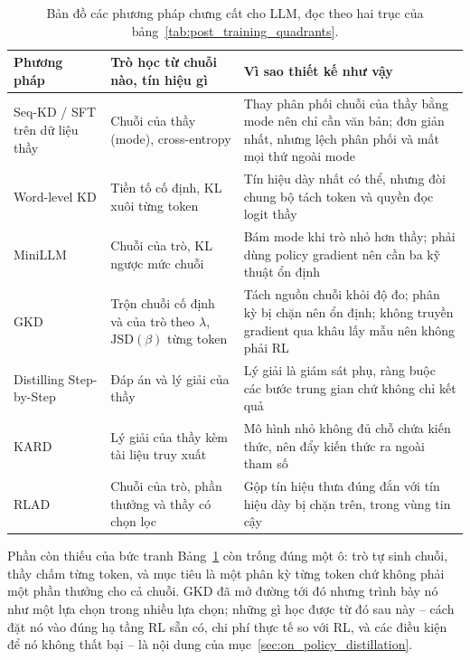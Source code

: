 \begin{table}[H]
\centering\small
\caption{Bản đồ các phương pháp chưng cất cho LLM, đọc theo hai trục của bảng~\ref{tab:post_training_quadrants}.}
\label{tab:llm_distillation_map}
\begin{tabularx}{\textwidth}{@{}>{\raggedright\arraybackslash}p{2.9cm}XX@{}}
\toprule
\textbf{Phương pháp} & \textbf{Trò học từ chuỗi nào, tín hiệu gì} & \textbf{Vì sao thiết kế như vậy} \\
\midrule
Seq-KD / SFT trên dữ liệu thầy & Chuỗi của thầy (mode), cross-entropy & Thay phân phối chuỗi của thầy bằng mode nên chỉ cần văn bản; đơn giản nhất, nhưng lệch phân phối và mất mọi thứ ngoài mode \\
\addlinespace
Word-level KD & Tiền tố cố định, KL xuôi từng token & Tín hiệu dày nhất có thể, nhưng đòi chung bộ tách token và quyền đọc logit thầy \\
\addlinespace
MiniLLM & Chuỗi của trò, KL ngược mức chuỗi & Bám mode khi trò nhỏ hơn thầy; phải dùng policy gradient nên cần ba kỹ thuật ổn định \\
\addlinespace
GKD & Trộn chuỗi cố định và của trò theo $\lambda$, $\mathrm{JSD}(\beta)$ từng token & Tách nguồn chuỗi khỏi độ đo; phân kỳ bị chặn nên ổn định; không truyền gradient qua khâu lấy mẫu nên không phải RL \\
\addlinespace
Distilling Step-by-Step & Đáp án và lý giải của thầy & Lý giải là giám sát phụ, ràng buộc các bước trung gian chứ không chỉ kết quả \\
\addlinespace
KARD & Lý giải của thầy kèm tài liệu truy xuất & Mô hình nhỏ không đủ chỗ chứa kiến thức, nên đẩy kiến thức ra ngoài tham số \\
\addlinespace
RLAD & Chuỗi của trò, phần thưởng và thầy có chọn lọc & Gộp tín hiệu thưa đúng đắn với tín hiệu dày bị chặn trên, trong vùng tin cậy \\
\bottomrule
\end{tabularx}
\end{table}

\begin{assess}{Phần còn thiếu của bức tranh}
Bảng~\ref{tab:llm_distillation_map} còn trống đúng một ô: trò tự sinh chuỗi, thầy chấm từng token, và mục tiêu là một phân kỳ từng token chứ không phải một phần thưởng cho cả chuỗi. GKD đã mở đường tới đó nhưng trình bày nó như một lựa chọn trong nhiều lựa chọn; những gì học được từ đó sau này -- cách đặt nó vào đúng hạ tầng RL sẵn có, chi phí thực tế so với RL, và các điều kiện để nó không thất bại -- là nội dung của mục~\ref{sec:on_policy_distillation}.
\end{assess}

